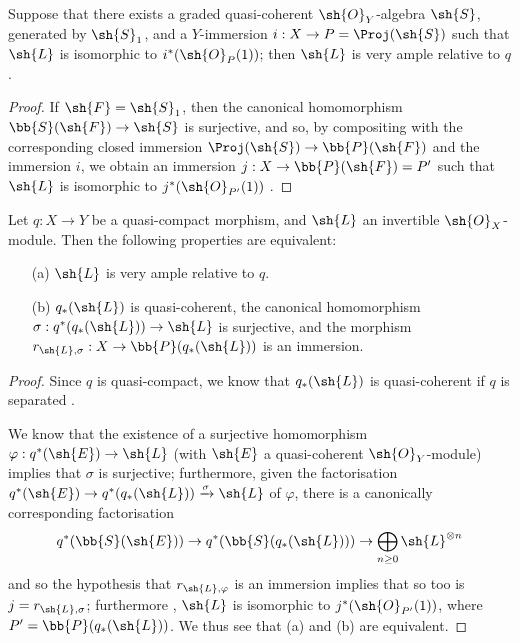 \begin{corollary}[4.4.3]
\label{II.4.4.3}
Suppose that there exists a graded quasi-coherent $\sh{O}_Y$-algebra $\sh{S}$, generated by $\sh{S}_1$, and a $Y$-immersion $i:X\to P=\Proj(\sh{S})$ such that $\sh{L}$ is isomorphic to $i^*(\sh{O}_P(1))$;
then $\sh{L}$ is very ample relative to $q$.
\end{corollary}

\begin{proof}
If $\sh{F}=\sh{S}_1$, then the canonical homomorphism $\bb{S}(\sh{F})\to\sh{S}$ is surjective, and so, by compositing with the corresponding closed immersion $\Proj(\sh{S})\to\bb{P}(\sh{F})$  and the immersion $i$, we obtain an immersion $j:X\to\bb{P}(\sh{F})=P'$ such that $\sh{L}$ is isomorphic to $j^*(\sh{O}_{P'}(1))$ .
\end{proof}

\begin{proposition}[4.4.4]
\label{II.4.4.4}
Let $q:X\to Y$ be a quasi-compact morphism, and $\sh{L}$ an invertible $\sh{O}_X$-module.
Then the following properties are equivalent:
\begin{enumerate}
  \item[\rm{(a)}] $\sh{L}$ is very ample relative to $q$.
  \item[\rm{(b)}] $q_*(\sh{L})$ is quasi-coherent, the canonical homomorphism $\sigma:q^*(q_*(\sh{L}))\to\sh{L}$ is surjective, and the morphism $r_{\sh{L},\sigma}:X\to\bb{P}(q_*(\sh{L}))$ is an immersion.
\end{enumerate}
\end{proposition}

\begin{proof}
Since $q$ is quasi-compact, we know that $q_*(\sh{L})$ is quasi-coherent if $q$ is separated .

We know  that the existence of a surjective homomorphism $\varphi:q^*(\sh{E})\to\sh{L}$ (with $\sh{E}$ a quasi-coherent $\sh{O}_Y$-module) implies that $\sigma$ is surjective;
furthermore, given the factorisation $q^*(\sh{E})\to q^*(q_*(\sh{L}))\xrightarrow{\sigma}\sh{L}$ of $\varphi$, there is a canonically corresponding factorisation
\[
  q^*(\bb{S}(\sh{E})) \to q^*(\bb{S}(q_*(\sh{L}))) \to \bigoplus_{n\geq0}\sh{L}^{\otimes n}
\]
and so  the hypothesis that $r_{\sh{L},\varphi}$ is an immersion implies that so too is $j=r_{\sh{L},\sigma}$;
furthermore , $\sh{L}$ is isomorphic to $j^*(\sh{O}_{P'}(1))$, where $P'=\bb{P}(q_*(\sh{L}))$.
We thus see that (a) and (b) are equivalent.
\end{proof}

